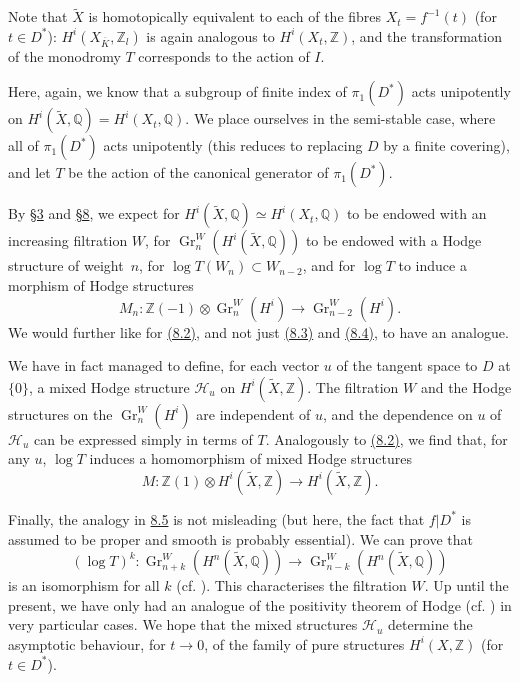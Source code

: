 \documentclass{article}
\theoremstyle{plain}
\theoremstyle{definition}
\newcommand{\ZZ}{\mathbb{Z}}
\newcommand{\QQ}{\mathbb{Q}}
\DeclareMathOperator{\Gr}{Gr}
\newcommand{\oldpage}[1]{\marginpar{\footnotesize$\Big\vert$ \textit{p.~#1}}}
\begin{document}
Note that $\widetilde{X}$ is homotopically equivalent to each of the fibres $X_t=f^{-1}(t)$ (for $t\in D^*$): $H^i(X_{\overline{K}},\ZZ_l)$ is again analogous to $H^i(X_t,\ZZ)$, and the transformation of the monodromy $T$ corresponds to the action of $I$.

Here, again, we know that a subgroup of finite index of $\pi_1(D^*)$ acts unipotently on $H^i(\widetilde{X},\QQ)=H^i(X_t,\QQ)$.
We place ourselves in the semi-stable case, where all of $\pi_1(D^*)$ acts unipotently (this reduces to replacing $D$ by a finite covering), and let $T$ be the action of the canonical generator of $\pi_1(D^*)$.

By \hyperref[3]{\S3} and \hyperref[8]{\S8}, we expect for $H^i(\widetilde{X},\QQ)\simeq H^i(X_t,\QQ)$ to be endowed with an increasing filtration $W$, for $\Gr_n^W(H^i(\widetilde{X},\QQ))$ to be endowed with a Hodge structure of weight~$n$, for $\log T(W_n)\subset W_{n-2}$, and for $\log T$ to induce a morphism of Hodge structures
\[
  M_n\colon \ZZ(-1)\otimes\Gr_n^W(H^i) \to \Gr_{n-2}^W(H^i).
\]
We would further like for \hyperref[8.2]{(8.2)}, and not just \hyperref[8.3]{(8.3)} and \hyperref[8.4]{(8.4)}, to have an analogue.

We have in fact managed to define, for each vector $u$ of the tangent space to $D$ at $\{0\}$, a mixed Hodge structure $\mathscr{H}_u$ on $H^i(\widetilde{X},\ZZ)$.
The filtration $W$ and the Hodge structures on the $\Gr_n^W(H^i)$ are independent of $u$, and the dependence on $u$ of $\mathscr{H}_u$ can be expressed
\oldpage{430}
simply in terms of $T$.
Analogously to \hyperref[8.2]{(8.2)}, we find that, for any $u$, $\log T$ induces a homomorphism of mixed Hodge structures
\[
  M\colon \ZZ(1)\otimes H^i(\widetilde{X},\ZZ) \to H^i(\widetilde{X},\ZZ).
\]

Finally, the analogy in \hyperref[8.5]{8.5} is not misleading (but here, the fact that $f|D^*$ is assumed to be proper and smooth is probably essential).
We can prove that
\[
  (\log T)^k\colon \Gr_{n+k}^W(H^n(\widetilde{X},\QQ)) \to \Gr_{n-k}^W(H^n(\widetilde{X},\QQ))
\]
is an isomorphism for all $k$ (cf. \cite[IV~6, Corollary to Theorem~5]{6}).
This characterises the filtration $W$.
Up until the present, we have only had an analogue of the positivity theorem of Hodge (cf. \cite[IV~7, Corollary to Theorem~7]{6}) in very particular cases.
We hope that the mixed structures $\mathscr{H}_u$ determine the asymptotic behaviour, for $t\to0$, of the family of pure structures $H^i(X,\ZZ)$ (for $t\in D^*$).


\end{document}
